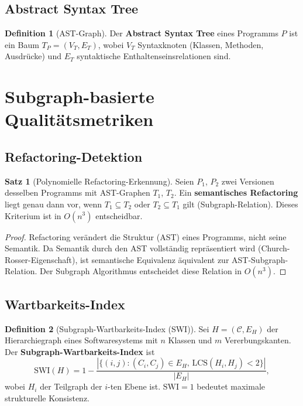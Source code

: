 ﻿\documentclass[a4paper,12pt]{scrreprt}
\theoremstyle{definition}
\newtheorem{definition}{Definition}[section]
\newtheorem{satz}{Satz}[section]
\begin{document}
\subsection{Abstract Syntax Tree}

\begin{definition}[AST-Graph]
  Der \textbf{Abstract Syntax Tree} eines Programms $P$ ist ein Baum
  $T_P = (V_T, E_T)$, wobei $V_T$ Syntaxknoten (Klassen, Methoden,
  Ausdrücke) und $E_T$ syntaktische Enthaltenseinsrelationen sind.
\end{definition}

\section{Subgraph-basierte Qualitätsmetriken}

\subsection{Refactoring-Detektion}

\begin{satz}[Polynomielle Refactoring-Erkennung]
  Seien $P_1$, $P_2$ zwei Versionen desselben Programms mit
  AST-Graphen $T_1$, $T_2$. Ein \textbf{semantisches Refactoring}
  liegt genau dann vor, wenn $T_1 \subseteq T_2$ oder $T_2 \subseteq T_1$
  gilt (Subgraph-Relation). Dieses Kriterium ist in $O(n^3)$
  entscheidbar.
\end{satz}

\begin{proof}
  Refactoring verändert die Struktur (AST) eines Programms, nicht
  seine Semantik. Da Semantik durch den AST vollständig repräsentiert
  wird (Church-Rosser-Eigenschaft), ist semantische Equivalenz
  äquivalent zur AST-Subgraph-Relation. Der Subgraph Algorithmus
  entscheidet diese Relation in $O(n^3)$.
\end{proof}

\subsection{Wartbarkeits-Index}

\begin{definition}[Subgraph-Wartbarkeits-Index (SWI)]
  \label{def:nf8_swi}
  Sei $H = (\mathcal{C}, E_H)$ der Hierarchiegraph eines
  Softwaresystems mit $n$ Klassen und $m$ Vererbungskanten.
  Der \textbf{Subgraph-Wartbarkeits-Index} ist
  \[
    \mathrm{SWI}(H) = 1 - \frac{|\{(i,j) : (C_i,C_j)\in E_H,\,
    \mathrm{LCS}(H_i, H_j) < 2\}|}{|E_H|},
  \]
  wobei $H_i$ der Teilgraph der $i$-ten Ebene ist.
  $\mathrm{SWI} = 1$ bedeutet maximale strukturelle Konsistenz.
\end{definition}
\end{document}
